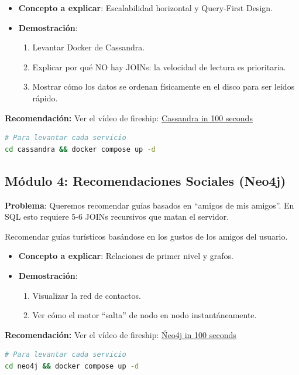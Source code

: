\documentclass[12pt,a4paper]{article}
\begin{document}
\begin{itemize}
    \item \textbf{Concepto a explicar}: Escalabilidad horizontal y Query-First Design.
    \item \textbf{Demostración}:
    \begin{enumerate}
        \item Levantar Docker de Cassandra.
        \item Explicar por qué NO hay JOINs: la velocidad de lectura es prioritaria.
        \item Mostrar cómo los datos se ordenan físicamente en el disco para ser leídos rápido.
    \end{enumerate}
\end{itemize}

\textbf{Recomendación: } Ver el vídeo de fireship: \href{https://www.youtube.com/watch?v=ziq7FUKpCS8}{Cassandra in 100 seconds}

\begin{lstlisting}[language=bash]
# Para levantar cada servicio
cd cassandra && docker compose up -d
\end{lstlisting}

\subsection{Módulo 4: Recomendaciones Sociales (Neo4j) }

\textbf{Problema}: Queremos recomendar guías basados en \enquote{amigos de mis amigos}. En SQL esto requiere 5-6 JOINs recursivos que matan el
servidor.

\begin{objetivo}
Recomendar guías turísticos basándose en los gustos de los amigos del usuario.
\end{objetivo}

\begin{itemize}
    \item \textbf{Concepto a explicar}: Relaciones de primer nivel y grafos.
    \item \textbf{Demostración}:
    \begin{enumerate}
        \item Visualizar la red de contactos.
        \item Ver cómo el motor \enquote{salta} de nodo en nodo instantáneamente.
    \end{enumerate}
\end{itemize}


\textbf{Recomendación: } Ver el vídeo de fireship: \href{https://www.youtube.com/watch?v=T6L9EoBy8Zk}{Ńeo4j in 100 seconds}

\begin{lstlisting}[language=bash]
# Para levantar cada servicio
cd neo4j && docker compose up -d
\end{lstlisting}
\end{document}
